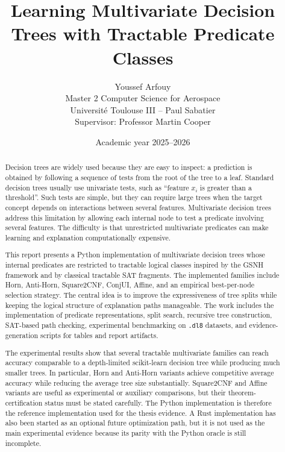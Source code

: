 \documentclass[11pt,a4paper]{article}
\title{Learning Multivariate Decision Trees with Tractable Predicate Classes}
\author{Youssef Arfouy\\Master 2 Computer Science for Aerospace\\Universit\'e Toulouse III -- Paul Sabatier\\Supervisor: Professor Martin Cooper}
\date{Academic year 2025--2026}
\begin{document}
\maketitle

\begin{abstract}
Decision trees are widely used because they are easy to inspect: a prediction is obtained by following a sequence of tests from the root of the tree to a leaf. Standard decision trees usually use univariate tests, such as ``feature $x_i$ is greater than a threshold''. Such tests are simple, but they can require large trees when the target concept depends on interactions between several features. Multivariate decision trees address this limitation by allowing each internal node to test a predicate involving several features. The difficulty is that unrestricted multivariate predicates can make learning and explanation computationally expensive.

This report presents a Python implementation of multivariate decision trees whose internal predicates are restricted to tractable logical classes inspired by the GSNH framework and by classical tractable SAT fragments. The implemented families include Horn, Anti-Horn, Square2CNF, ConjUI, Affine, and an empirical best-per-node selection strategy. The central idea is to improve the expressiveness of tree splits while keeping the logical structure of explanation paths manageable. The work includes the implementation of predicate representations, split search, recursive tree construction, SAT-based path checking, experimental benchmarking on \texttt{.dl8} datasets, and evidence-generation scripts for tables and report artifacts.

The experimental results show that several tractable multivariate families can reach accuracy comparable to a depth-limited scikit-learn decision tree while producing much smaller trees. In particular, Horn and Anti-Horn variants achieve competitive average accuracy while reducing the average tree size substantially. Square2CNF and Affine variants are useful as experimental or auxiliary comparisons, but their theorem-certification status must be stated carefully. The Python implementation is therefore the reference implementation used for the thesis evidence. A Rust implementation has also been started as an optional future optimization path, but it is not used as the main experimental evidence because its parity with the Python oracle is still incomplete.
\end{abstract}
\end{document}
